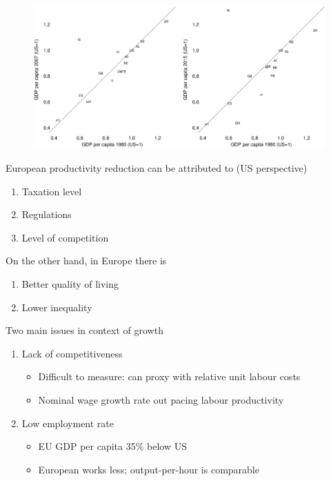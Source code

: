 \documentclass{beamer}
\begin{document}
\begin{frame}
  \begin{figure}
    \includegraphics[scale=.3]{versus_us3.eps}
  \end{figure}
\end{frame}

\begin{frame}
  European productivity reduction can be attributed to (US perspective)  
  \begin{enumerate}
  \item Taxation level
  \item Regulations
  \item Level of competition
\end{enumerate}
\medskip
On the other hand, in Europe there is
\begin{enumerate}
   \item Better quality of living
   \item Lower inequality
 \end{enumerate} 
\end{frame}

\begin{frame}
  Two main issues in context of growth
  \begin{enumerate}
    \item Lack of competitiveness
    \begin{itemize}
      \item Difficult to measure:  can proxy with relative unit labour costs
      \item Nominal wage growth rate out pacing labour productivity
    \end{itemize}
    \medskip
    \item Low employment rate
    \begin{itemize}
      \item EU GDP per capita 35\% below US
      \item European works less; output-per-hour is comparable
    \end{itemize}
  \end{enumerate}
\end{frame}
\end{document}
